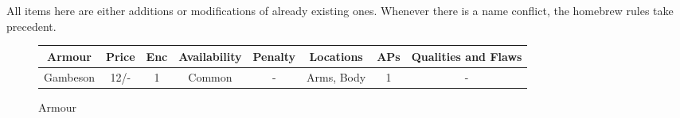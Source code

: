 \documentclass[parskip=full,11pt]{wfrp-short}
\begin{document}
All items here are either additions or modifications of already existing ones.
Whenever there is a name conflict, the homebrew rules take precedent.

\begin{figure*}[b]
    \begin{tcolorbox}[standard jigsaw, colback=yellow!5!orange, opacityback=.25, boxrule=0pt]
    \caption{Armour}
    \centering
    \begin{tabu}{c|c|c|c|c|c|c|c}
        \rowfont{\bfseries} Armour & Price & Enc & Availability &
            Penalty & Locations & APs & Qualities and Flaws\\
        \hline
        Gambeson & 12/- & 1 & Common & - & Arms, Body & 1 & -\\
    \end{tabu}
    \end{tcolorbox}
\end{figure*}
\end{document}
